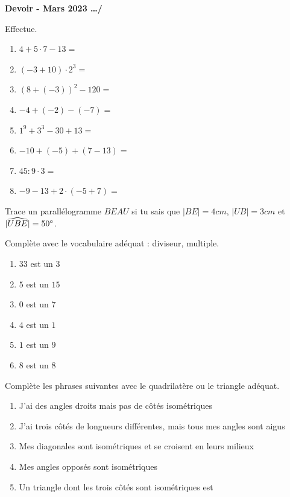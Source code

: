 \documentclass[12pt,parskip=half-, twoside=semi]{scrartcl}
\newcommand{\montitre}{Devoir - Mars 2023}
\begin{document}
\begin{huge}
    \bfseries
    \montitre
    \hfill
    \dots/
    \bigbreak
\end{huge}
	
\begin{exercise}[points=8]
	Effectue. 
	\begin{enumerate}[cols=2, itemsep=4cm]
		\item \(4+5\cdot 7-13=\)
		\item \(\left(-3+10\right)\cdot 2^3=\)
		\item \(\left(8+(-3)\right)^2 - 120=\)
		\item \(-4+(-2)-(-7)=\)
		\item \(1^9 + 3^3 - 30 + 13=\)
		\item \(-10+(-5) + \left(7-13\right)=\)
		\item \(45:9\cdot 3 =\)
		\item \(-9-13+2\cdot (-5+7)=\)
	\end{enumerate}	
\end{exercise}

\newpage
\begin{exercise}[points=2]
	Trace un parallélogramme $BEAU$ si tu sais que $|BE|=4cm$, $|UB|=3cm$ et $|\widehat{UBE}|=50\degree $.
	\vspace{5cm}
\end{exercise}

\begin{exercise}[points=6]
	Complète avec le vocabulaire adéquat : diviseur, multiple.
	\begin{enumerate}[cols=2, itemsep=.5cm]
		\item \(33\) est un  \dotfill \(3\)
		\item \(5\) est un  \dotfill \(15\)
		\item \(0\) est un  \dotfill \(7\)
		\item \(4\) est un  \dotfill \(1\)
		\item \(1\) est un  \dotfill \(9\)
		\item \(8\) est un  \dotfill \(8\)
	\end{enumerate}
\end{exercise}

\begin{exercise}[points=5]
	Complète les phrases suivantes avec le quadrilatère ou le triangle adéquat. 
	\begin{enumerate}[itemsep=1.5cm]
		\item J'ai des angles droits mais pas de côtés isométriques  
		\item J'ai trois côtés de longueurs différentes, mais tous mes angles sont aigus 
		\item Mes diagonales sont isométriques et se croisent en leurs milieux  
		\item Mes angles opposés sont isométriques 
		\item Un triangle dont les trois côtés sont isométriques est
	\end{enumerate}
\end{exercise}
\end{document}

